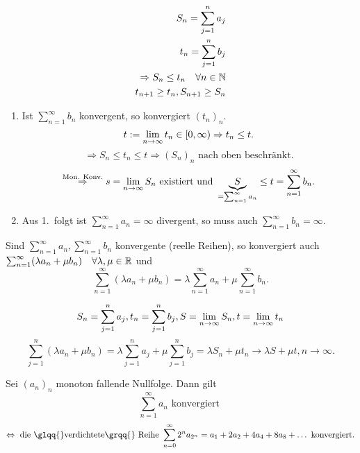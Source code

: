 \documentclass[../ana1.tex]{subfiles}
\begin{document}
\begin{bew}
	\begin{align*}
		S_n = \sum_{j=1}^{n}a_j\\
		t_n = \sum_{j=1}^{n}b_j\\
		\Rightarrow S_n \leq t_n \quad \forall n\in\mathbb{N} \\
		t_{n+1}\geq t_n, S_{n+1}\geq S_n
	\end{align*}
	\begin{enumerate}
		\item Ist \( \sum_{n=1}^{\infty}b_n \) konvergent, so konvergiert \({(t_n)}_n\).\\
		\[ t:= \lim\limits_{n\rightarrow\infty}t_n\in [0,\infty) \Rightarrow t_n \leq t. \]
		\[ \Rightarrow S_n \leq t_n \leq t \Rightarrow {(S_n)}_n \text{ nach oben beschränkt.} \]
		\[ \overset{\text{Mon. Konv.}}{\Rightarrow} s = \lim\limits_{n\rightarrow\infty} S_n \text{ existiert und } \underbrace{S}_{= \sum_{n=1}^{\infty}a_n} \leq t = \sum_{n=1}^{\infty} b_n. \]
		\item Aus 1.\ folgt ist \( \sum_{n=1}^{\infty}a_n =\infty \) divergent, so muss auch \( \sum_{n=1}^{\infty}b_n = \infty \).
	\end{enumerate}
\end{bew}
\begin{satz}
	Sind \( \sum_{n=1}^{\infty}a_n, \sum_{n=1}^{\infty}b_n \) konvergente (reelle Reihen), so konvergiert auch \( \sum_{n=1}^{\infty}(\lambda a_n + \mu b_n) \quad \forall \lambda, \mu \in\mathbb{R} \) und 
	\[ \sum_{n=1}^{\infty} (\lambda a_n + \mu b_n) = \lambda \sum_{n=1}^{\infty}a_n + \mu \sum_{n=1}^{\infty}b_n. \]
\end{satz}
\begin{bew}
	\[ S_n = \sum_{j=1}^{n}a_j, t_n = \sum_{j=1}^{n}b_j, S = \lim\limits_{n\rightarrow\infty}S_n, t = \lim\limits_{n\rightarrow\infty}t_n \]
	\[ \sum_{j=1}^{n}(\lambda a_n + \mu b_n) = \lambda\sum_{j=1}^{n}a_j + \mu \sum_{j=1}^{n}b_j = \lambda S_n + \mu t_n \rightarrow \lambda S + \mu t, n\rightarrow\infty. \]
\end{bew}
\begin{satz}
	Sei \({(a_n)}_n\) monoton fallende Nullfolge. Dann gilt
	\[\sum_{n=1}^{\infty} a_n \text{ konvergiert }\]
	\[\Leftrightarrow \text{ die \glqq{}verdichtete\grqq{} Reihe } \sum_{n=0}^{\infty}2^n a_{2^n} = a_1 + 2a_2 + 4a_4 + 8 a_8 + \dots \text{ konvergiert}.\]
\end{satz}
\end{document}
